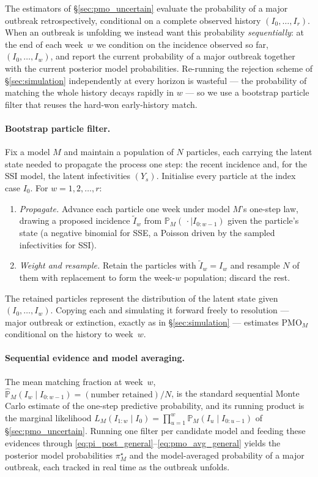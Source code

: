 \documentclass{article}
\theoremstyle{definition}
\begin{document}
The estimators of \S\ref{sec:pmo_uncertain} evaluate the probability of a major
outbreak retrospectively, conditional on a complete observed history
$(I_0, \ldots, I_r)$.  When an outbreak is unfolding we instead want this
probability \emph{sequentially}: at the end of each week~$w$ we condition on the
incidence observed so far, $(I_0, \ldots, I_w)$, and report the current
probability of a major outbreak together with the current posterior model
probabilities.  Re-running the rejection scheme of \S\ref{sec:simulation}
independently at every horizon is wasteful --- the probability of matching the
whole history decays rapidly in $w$ --- so we use a bootstrap particle filter
that reuses the hard-won early-history match.

\paragraph{Bootstrap particle filter.}
Fix a model $M$ and maintain a population of $N$ particles, each carrying the
latent state needed to propagate the process one step: the recent incidence and,
for the SSI model, the latent infectivities $(Y_s)$.  Initialise every particle
at the index case $I_0$.  For $w = 1, 2, \ldots, r$:
\begin{enumerate}
  \item \emph{Propagate.}  Advance each particle one week under model $M$'s
    one-step law, drawing a proposed incidence $\tilde I_w$ from
    $\mathbb{P}_M(\,\cdot \mid I_{0:w-1})$ given the particle's state (a negative
    binomial for SSE, a Poisson driven by the sampled infectivities for SSI).
  \item \emph{Weight and resample.}  Retain the particles with
    $\tilde I_w = I_w$ and resample $N$ of them with replacement to form the
    week-$w$ population; discard the rest.
\end{enumerate}
The retained particles represent the distribution of the latent state given
$(I_0, \ldots, I_w)$.  Copying each and simulating it forward freely to
resolution --- major outbreak or extinction, exactly as in
\S\ref{sec:simulation} --- estimates $\mathrm{PMO}_M$ conditional on the history
to week~$w$.

\paragraph{Sequential evidence and model averaging.}
The mean matching fraction at week~$w$,
$\widehat{\mathbb{P}}_M(I_w \mid I_{0:w-1}) = (\text{number retained})/N$, is the
standard sequential Monte Carlo estimate of the one-step predictive probability,
and its running product is the marginal likelihood
$L_M(I_{1:w} \mid I_0) = \prod_{u=1}^{w} \mathbb{P}_M(I_u \mid I_{0:u-1})$ of
\S\ref{sec:pmo_uncertain}.  Running one filter per candidate model and feeding
these evidences through
\eqref{eq:pi_post_general}--\eqref{eq:pmo_avg_general} yields the posterior model
probabilities $\pi_M^\star$ and the model-averaged probability of a major
outbreak, each tracked in real time as the outbreak unfolds.
\end{document}
